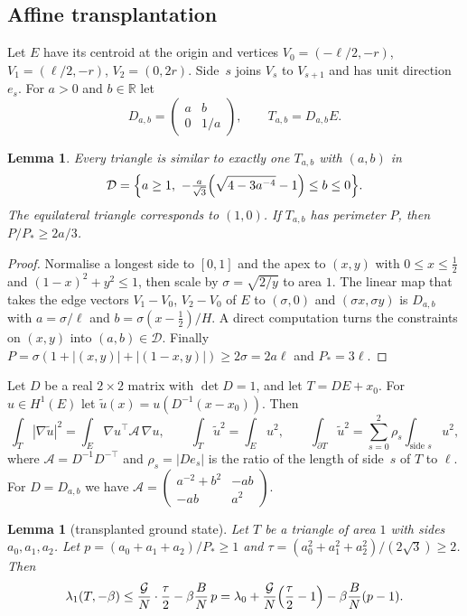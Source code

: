 \documentclass[11pt]{article}
\newtheorem{lemma}[theorem]{Lemma}
\theoremstyle{remark}
\newcommand{\R}{\mathbb{R}}
\newcommand{\E}{E}
\begin{document}
\subsection{Affine transplantation}

Let $\E$ have its centroid at the origin and vertices $V_0=(-\ell/2,-r)$, $V_1=(\ell/2,-r)$, $V_2=(0,2r)$.
Side~$s$ joins $V_s$ to $V_{s+1}$ and has unit direction $e_s$. For $a>0$ and $b\in\R$ let
\[
  D_{a,b}=\begin{pmatrix}a&b\\0&1/a\end{pmatrix},\qquad T_{a,b}=D_{a,b}\E .
\]

\begin{lemma}\label{lem:shape}
Every triangle is similar to exactly one $T_{a,b}$ with $(a,b)$ in
\[
  \mathcal D=\Bigl\{a\ge1,\ -\tfrac{a}{\sqrt3}\Bigl(\sqrt{4-3a^{-4}}-1\Bigr)\le b\le0\Bigr\}.
\]
The equilateral triangle corresponds to $(1,0)$. If $T_{a,b}$ has perimeter $P$, then $P/P_*\ge 2a/3$.
\end{lemma}

\begin{proof}
Normalise a longest side to $[0,1]$ and the apex to $(x,y)$ with $0\le x\le\frac12$ and
$(1-x)^2+y^2\le1$, then scale by $\sigma=\sqrt{2/y}$ to area $1$. The linear map that takes the edge
vectors $V_1-V_0$, $V_2-V_0$ of $\E$ to $(\sigma,0)$ and $(\sigma x,\sigma y)$ is $D_{a,b}$ with
$a=\sigma/\ell$ and $b=\sigma(x-\frac12)/H$. A direct computation turns the constraints on $(x,y)$ into
$(a,b)\in\mathcal D$. Finally $P=\sigma(1+|(x,y)|+|(1-x,y)|)\ge2\sigma=2a\ell$ and $P_*=3\ell$.
\end{proof}

Let $D$ be a real $2\times2$ matrix with $\det D=1$, and let $T=D\E+x_0$. For $u\in H^1(\E)$ let
$\tilde u(x)=u(D^{-1}(x-x_0))$. Then
\begin{equation}\label{eq:transplant}
  \int_{T}|\nabla\tilde u|^2=\int_\E\nabla u^{\top}\mathcal A\,\nabla u,\qquad
  \int_T\tilde u^2=\int_\E u^2,\qquad
  \int_{\partial T}\tilde u^2=\sum_{s=0}^2\rho_s\int_{\text{side }s}u^2,
\end{equation}
where $\mathcal A=D^{-1}D^{-\top}$ and $\rho_s=|De_s|$ is the ratio of the length of side~$s$ of $T$ to
$\ell$. For $D=D_{a,b}$ we have
$\mathcal A=\left(\begin{smallmatrix}a^{-2}+b^2&-ab\\-ab&a^2\end{smallmatrix}\right)$.

\begin{lemma}[transplanted ground state]\label{lem:transplant}
Let $T$ be a triangle of area $1$ with sides $a_0,a_1,a_2$. Let $p=(a_0+a_1+a_2)/P_*\ge1$ and
$\tau=(a_0^2+a_1^2+a_2^2)/(2\sqrt3)\ge2$. Then
\[
  \lambda_1(T,-\beta)\le\frac{\mathcal G}N\cdot\frac\tau2-\beta\frac BN\,p
  =\lambda_0+\frac{\mathcal G}N\Bigl(\frac\tau2-1\Bigr)-\beta\frac BN(p-1).
\]
\end{lemma}
\end{document}
